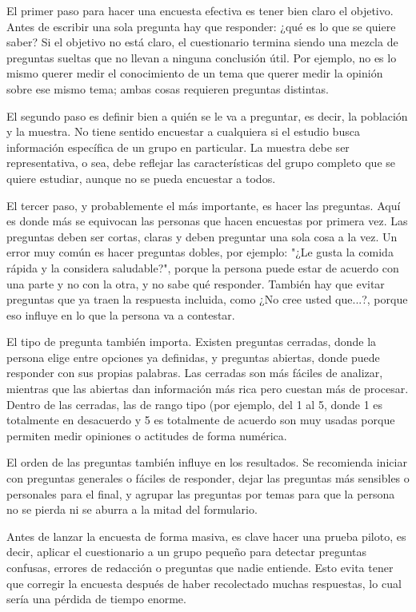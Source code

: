 \documentclass[12pt,letterpaper]{article}
\begin{document}
El primer paso para hacer una encuesta efectiva es tener bien claro el objetivo. Antes de escribir una sola pregunta hay que responder: ¿qué es lo que se quiere saber? Si el objetivo no está claro, el cuestionario termina siendo una mezcla de preguntas sueltas que no llevan a ninguna conclusión útil. Por ejemplo, no es lo mismo querer medir el conocimiento de un tema que querer medir la opinión sobre ese mismo tema; ambas cosas requieren preguntas distintas.

El segundo paso es definir bien a quién se le va a preguntar, es decir, la población y la muestra. No tiene sentido encuestar a cualquiera si el estudio busca información específica de un grupo en particular. La muestra debe ser representativa, o sea, debe reflejar las características del grupo completo que se quiere estudiar, aunque no se pueda encuestar a todos.

El tercer paso, y probablemente el más importante, es hacer  las preguntas. Aquí es donde más se equivocan las personas que hacen encuestas por primera vez. Las preguntas deben ser cortas, claras y deben preguntar una sola cosa a la vez. Un error muy común es hacer preguntas dobles, por ejemplo: "¿Le gusta la comida rápida y la considera saludable?", porque la persona puede estar de acuerdo con una parte y no con la otra, y no sabe qué responder. También hay que evitar preguntas que ya traen la respuesta incluida, como ¿No cree usted que...?, porque eso influye en lo que la persona va a contestar.

El tipo de pregunta también importa. Existen preguntas cerradas, donde la persona elige entre opciones ya definidas, y preguntas abiertas, donde puede responder con sus propias palabras. Las cerradas son más fáciles de analizar, mientras que las abiertas dan información más rica pero cuestan más de procesar. Dentro de las cerradas, las de rango tipo (por ejemplo, del 1 al 5, donde 1 es totalmente en desacuerdo y 5 es totalmente de acuerdo son muy usadas porque permiten medir opiniones o actitudes de forma numérica.

El orden de las preguntas también influye en los resultados. Se recomienda iniciar con preguntas generales o fáciles de responder, dejar las preguntas más sensibles o personales para el final, y agrupar las preguntas por temas para que la persona no se pierda ni se aburra a la mitad del formulario.

Antes de lanzar la encuesta de forma masiva, es clave hacer una prueba piloto, es decir, aplicar el cuestionario a un grupo pequeño para detectar preguntas confusas, errores de redacción o preguntas que nadie entiende. Esto evita tener que corregir la encuesta después de haber recolectado muchas respuestas, lo cual sería una pérdida de tiempo enorme.
\end{document}
